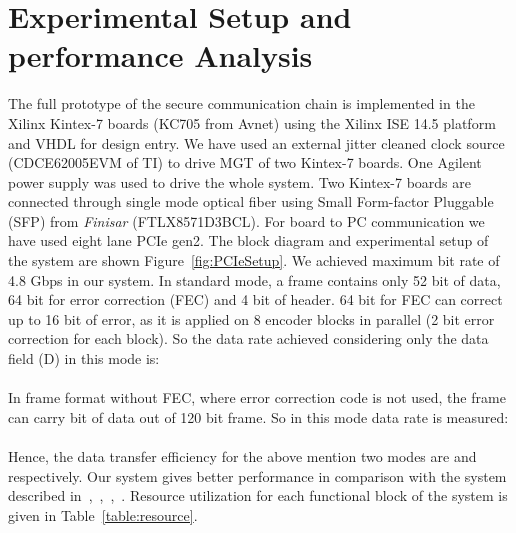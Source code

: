 \documentclass[a4paper]{jpconf}
\begin{document}
\iffalse.Figure~\ref{fig:FrameAlignerWork} shows how this block works.\fi   
\vspace{- 1 pc}
\section{Experimental Setup and performance Analysis} \label{PerformenceEvoluation}
The full prototype of the secure communication chain is implemented in the Xilinx Kintex-7 boards (KC705 from Avnet) using the Xilinx ISE 14.5 platform and VHDL for design entry. We have used an external jitter cleaned clock source (CDCE62005EVM of TI) to drive MGT of two Kintex-7 boards. One Agilent power supply was used to drive the whole system. Two Kintex-7 boards are connected through single mode optical fiber using Small Form-factor Pluggable (SFP) from \textit{Finisar} (FTLX8571D3BCL). For board to PC communication we have used eight lane PCIe gen2. 
The block diagram and experimental setup of the system are shown Figure~\ref{fig:PCIeSetup}. We achieved maximum bit rate of 4.8 Gbps in our system. In standard mode, a frame contains only 52 bit of data, 64 bit for error correction (FEC) and 4 bit of header. 64 bit for FEC can correct up to 16 bit of error, as it is applied on 8 encoder blocks in parallel (2 bit error correction for each block). So the data rate achieved considering only the data field (D) in this mode is: \\
 \\
In frame format without FEC, where error correction code is not used, the frame can carry  bit of data out of 120 bit frame.
So in this mode data rate is measured: \\
 \\
Hence, the data transfer efficiency for the above mention two modes are  and  respectively. Our system gives better performance in comparison with the system described in~\cite{kadric:socc:2012},~\cite{haoxu:nss:2007:XX},~\cite {mattihalli:cecnet:2012},~\cite{bohm:nss:mic:2012}.
Resource utilization for each functional block of the system is given in Table~\ref{table:resource}. 
\end{document}
